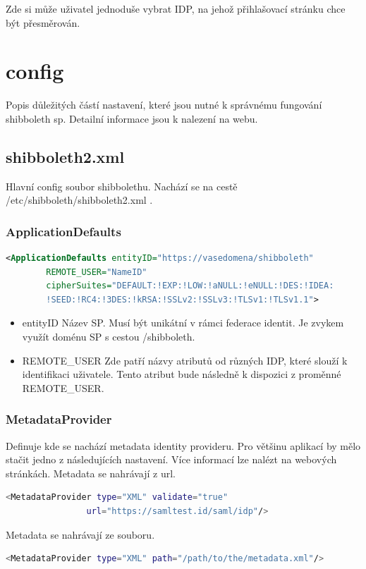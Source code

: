 Zde si může uživatel jednoduše vybrat IDP, na jehož přihlašovací stránku chce být přesměrován.

\chapter{config}
Popis důležitých částí nastavení, které jsou nutné k správnému fungování shibboleth sp. Detailní informace jsou k nalezení na webu\cite{SPconfig}. 

\section{shibboleth2.xml}
Hlavní config soubor shibbolethu. Nachází se na cestě /etc/shibboleth/shibboleth2.xml .

\subsection{ApplicationDefaults}
\begin{lstlisting}[language=xml]
<ApplicationDefaults entityID="https://vasedomena/shibboleth"
        REMOTE_USER="NameID"
        cipherSuites="DEFAULT:!EXP:!LOW:!aNULL:!eNULL:!DES:!IDEA:
        !SEED:!RC4:!3DES:!kRSA:!SSLv2:!SSLv3:!TLSv1:!TLSv1.1">
\end{lstlisting}
\begin{itemize}
    \item entityID \linebreak
    Název SP. Musí být unikátní v rámci federace identit. Je zvykem využít doménu SP s cestou /shibboleth.  
    \item REMOTE\_USER \linebreak
    Zde patří názvy atributů od různých IDP, které slouží k identifikaci uživatele. 
    Tento atribut bude následně k dispozici z proměnné REMOTE\_USER.
\end{itemize}
\subsection{MetadataProvider}
Definuje kde se nachází metadata identity provideru. Pro většinu aplikací by mělo stačit jedno z následujících nastavení. Více informací lze nalézt na webových stránkách\cite{MetadataProvider}.
\linebreak \linebreak
Metadata se nahrávají z url.
\begin{lstlisting}[language=Bash]
 <MetadataProvider type="XML" validate="true"
                url="https://samltest.id/saml/idp"/>
\end{lstlisting}
Metadata se nahrávají ze souboru.
\begin{lstlisting}[language=Bash]
 <MetadataProvider type="XML" path="/path/to/the/metadata.xml"/>
\end{lstlisting}


